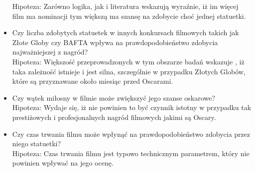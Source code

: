 \begin{itemize}
Hipoteza: Zarówno logika, jak i literatura wskazują wyraźnie, iż im więcej film ma nominacji tym większą ma szansę na zdobycie choć jednej statuetki.
  \item  Czy liczba zdobytych statuetek w innych konkursach filmowych takich jak Złote Globy czy BAFTA wpływa na prawdopodobieństwo zdobycia najważniejszej z nagród? \vspace{0.2cm}\\
Hipoteza: Większość przeprowadzonych w tym obszarze badań wskazuje , iż taka zależność istnieje i jest silna, szczególnie w przypadku Złotych Globów, które są przyznawane około miesiąc przed Oscarami.
  \item Czy wątek miłosny w filmie może zwiększyć jego szanse oskarowe? \vspace{0.2cm}\\
Hipoteza: Wydaje się, iż nie powinien to być czynnik istotny w przypadku tak prestiżowych i profesjonalnych nagród filmowych jakimi są Oscary.
  \item Czy czas trwania filmu może wpłynąć na prawdopodobieństwo zdobycia przez niego statuetki?  \vspace{0.2cm}\\
Hipoteza: Czas trwania filmu jest typowo technicznym parametrem, który nie powinien wpływać na jego ocenę.
\end{itemize}
